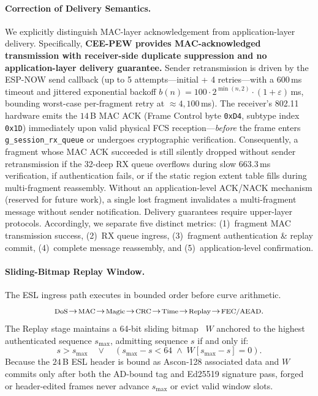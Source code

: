 \documentclass[conference]{IEEEtran}
\begin{document}
\paragraph{Correction of Delivery Semantics.} We explicitly distinguish MAC-layer acknowledgement from application-layer delivery. Specifically, \textbf{CEE-PEW provides MAC-acknowledged transmission with receiver-side duplicate suppression and no application-layer delivery guarantee.} Sender retransmission is driven by the ESP-NOW send callback (up to 5 attempts---initial + 4 retries---with a $600$\,ms timeout and jittered exponential backoff $b(n) = 100\cdot 2^{\min(n,2)}\cdot(1+\varepsilon)$\,ms, bounding worst-case per-fragment retry at $\approx 4{,}100$\,ms). The receiver's 802.11 hardware emits the $14$\,B MAC ACK (Frame Control byte \texttt{0xD4}, subtype index \texttt{0x1D}) immediately upon valid physical FCS reception---\emph{before} the frame enters \texttt{g\_session\_rx\_queue} or undergoes cryptographic verification. Consequently, a fragment whose MAC ACK succeeded is still silently dropped without sender retransmission if the 32-deep RX queue overflows during slow $663.3$\,ms verification, if authentication fails, or if the static region extent table fills during multi-fragment reassembly. Without an application-level ACK/NACK mechanism (reserved for future work), a single lost fragment invalidates a multi-fragment message without sender notification. Delivery guarantees require upper-layer protocols. Accordingly, we separate five distinct metrics: (1)~fragment MAC transmission success, (2)~RX queue ingress, (3)~fragment authentication \& replay commit, (4)~complete message reassembly, and (5)~application-level confirmation.

\paragraph{Sliding-Bitmap Replay Window.} The ESL ingress path executes in bounded order before curve arithmetic.
\begin{equation}
\text{\footnotesize DoS}\!\rightarrow\!\text{\footnotesize MAC}\!\rightarrow\!\text{\footnotesize Magic}\!\rightarrow\!\text{\footnotesize CRC}\!\rightarrow\!\text{\footnotesize Time}\!\rightarrow\!\text{\footnotesize Replay}\!\rightarrow\!\text{\footnotesize FEC/AEAD}.
\label{eq:rx_order}
\end{equation}
The Replay stage maintains a 64-bit sliding bitmap~\cite{donenfeld2017} $W$ anchored to the highest authenticated sequence $s_{\max}$, admitting sequence $s$ if and only if:
\begin{equation}
s > s_{\max} \quad \lor \quad \left(s_{\max} - s < 64 \;\land\; W[s_{\max} - s] = 0\right).
\label{eq:replay}
\end{equation}
Because the $24$\,B ESL header is bound as Ascon-128 associated data and $W$ commits only after both the AD-bound tag and Ed25519 signature pass, forged or header-edited frames never advance $s_{\max}$ or evict valid window slots.
\end{document}
